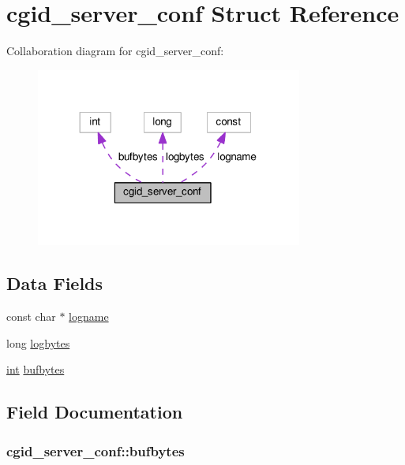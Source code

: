 \hypertarget{structcgid__server__conf}{}\section{cgid\+\_\+server\+\_\+conf Struct Reference}
\label{structcgid__server__conf}


Collaboration diagram for cgid\+\_\+server\+\_\+conf\+:
\nopagebreak
\begin{figure}[H]
\begin{center}
\leavevmode
\includegraphics[width=248pt]{structcgid__server__conf__coll__graph}
\end{center}
\end{figure}
\subsection*{Data Fields}
\begin{DoxyCompactItemize}
\item 
const char $\ast$ \hyperlink{structcgid__server__conf_a43a8a3c8e3043f225994110acb890f86}{logname}
\item 
long \hyperlink{structcgid__server__conf_a39b1cb84906f007e785a3de43d2ae058}{logbytes}
\item 
\hyperlink{pcre_8txt_a42dfa4ff673c82d8efe7144098fbc198}{int} \hyperlink{structcgid__server__conf_a050908a6d8be3634bc2a6a166b5b1d3a}{bufbytes}
\end{DoxyCompactItemize}


\subsection{Field Documentation}
\subsubsection[{\texorpdfstring{bufbytes}{bufbytes}}]{ cgid\+\_\+server\+\_\+conf\+::bufbytes}\hypertarget{structcgid__server__conf_a050908a6d8be3634bc2a6a166b5b1d3a}{}\label{structcgid__server__conf_a050908a6d8be3634bc2a6a166b5b1d3a}

